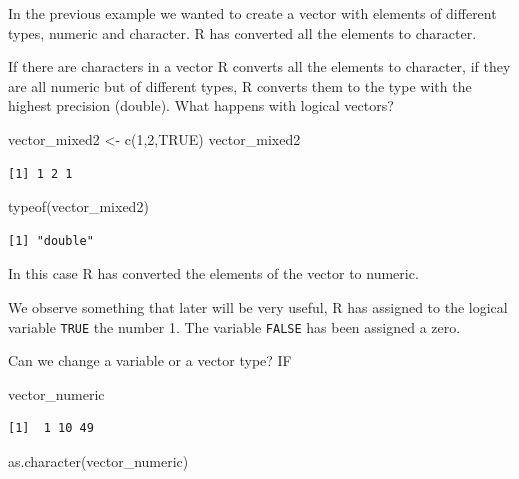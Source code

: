 \documentclass[
  letterpaper,
  DIV=11,
  numbers=noendperiod]{scrartcl}
\newenvironment{Shaded}{\begin{snugshade}}{\end{snugshade}}
\newcommand{\ConstantTok}[1]{\textcolor[rgb]{0.56,0.35,0.01}{#1}}
\newcommand{\DecValTok}[1]{\textcolor[rgb]{0.68,0.00,0.00}{#1}}
\newcommand{\FunctionTok}[1]{\textcolor[rgb]{0.28,0.35,0.67}{#1}}
\newcommand{\NormalTok}[1]{\textcolor[rgb]{0.00,0.23,0.31}{#1}}
\newcommand{\OtherTok}[1]{\textcolor[rgb]{0.00,0.23,0.31}{#1}}
\begin{document}
In the previous example we wanted to create a vector with elements of
different types, numeric and character. R has converted all the elements
to character.

If there are characters in a vector R converts all the elements to
character, if they are all numeric but of different types, R converts
them to the type with the highest precision (double). What happens with
logical vectors?

\begin{Shaded}
\begin{Highlighting}[]
\NormalTok{vector\_mixed2 }\OtherTok{\textless{}{-}} \FunctionTok{c}\NormalTok{(}\DecValTok{1}\NormalTok{,}\DecValTok{2}\NormalTok{,}\ConstantTok{TRUE}\NormalTok{)}
\NormalTok{vector\_mixed2}
\end{Highlighting}
\end{Shaded}

\begin{verbatim}
[1] 1 2 1
\end{verbatim}

\begin{Shaded}
\begin{Highlighting}[]
\FunctionTok{typeof}\NormalTok{(vector\_mixed2)}
\end{Highlighting}
\end{Shaded}

\begin{verbatim}
[1] "double"
\end{verbatim}

In this case R has converted the elements of the vector to numeric.

We observe something that later will be very useful, R has assigned to
the logical variable \texttt{TRUE} the number 1. The variable
\texttt{FALSE} has been assigned a zero.

Can we change a variable or a vector type? IF

\begin{Shaded}
\begin{Highlighting}[]
\NormalTok{vector\_numeric}
\end{Highlighting}
\end{Shaded}

\begin{verbatim}
[1]  1 10 49
\end{verbatim}

\begin{Shaded}
\begin{Highlighting}[]
\FunctionTok{as.character}\NormalTok{(vector\_numeric)}
\end{Highlighting}
\end{Shaded}
\end{document}
